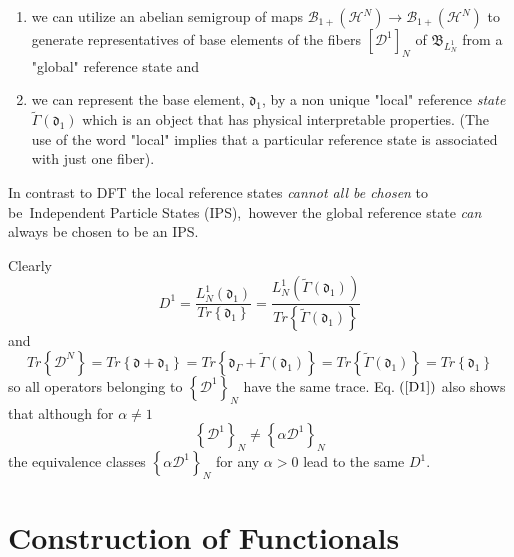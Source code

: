 \documentclass[aps,preprint]{revtex4}%
\begin{document}
\begin{enumerate}
\item we can utilize an abelian semigroup of maps $\mathcal{B}_{1+}\left(
\mathcal{H}^{N}\right)  \rightarrow\mathcal{B}_{1+}\left(  \mathcal{H}%
^{N}\right)  $ to generate representatives of base elements of the fibers
$\left[  \mathcal{D}^{1}\right]  _{N}$ of $\mathfrak{B}_{L_{N}^{1}}$ from a
"global" reference state and

\item we can represent the base element, $\mathfrak{d}_{1}$, by a non unique
"local" reference \emph{state} $\tilde{\Gamma}\left(  \mathfrak{d}_{1}\right)
$ which is an object that has physical interpretable properties. (The use of
the word "local" implies that a particular reference state is associated with
just one fiber).
\end{enumerate}

In contrast to DFT the local reference states \emph{cannot all be chosen }to
be\emph{\ }Independent Particle States (IPS),\emph{\ }however the global
reference state \emph{can }always be chosen to be an IPS.

Clearly
\begin{equation}
D^{1}=\frac{L_{N}^{1}\left(  \mathfrak{d}_{1}\right)  }{Tr\left\{
\mathfrak{d}_{1}\right\}  }=\frac{L_{N}^{1}\left(  \tilde{\Gamma}\left(
\mathfrak{d}_{1}\right)  \right)  }{Tr\left\{  \tilde{\Gamma}\left(
\mathfrak{d}_{1}\right)  \right\}  } \label{D1}%
\end{equation}
and
\begin{equation}
Tr\left\{  \mathcal{D}^{N}\right\}  =Tr\left\{  \mathfrak{d}+\mathfrak{d}%
_{1}\right\}  =Tr\left\{  \mathfrak{d}_{\Gamma}+\tilde{\Gamma}\left(
\mathfrak{d}_{1}\right)  \right\}  =Tr\left\{  \tilde{\Gamma}\left(
\mathfrak{d}_{1}\right)  \right\}  =Tr\left\{  \mathfrak{d}_{1}\right\}
\end{equation}
so all operators belonging to $\left\{  \mathcal{D}^{1}\right\}  _{N}$ have
the same trace. Eq. $\left(  \ref{D1}\right)  $ also shows that although for
$\alpha\neq1$
\begin{equation}
\left\{  \mathcal{D}^{1}\right\}  _{N}\neq\left\{  \alpha\mathcal{D}%
^{1}\right\}  _{N}%
\end{equation}
the equivalence classes $\left\{  \alpha\mathcal{D}^{1}\right\}  _{N}$ for any
$\alpha>0$ lead to the same $D^{1}$.

\section{Construction of Functionals \label{Functionals}}
\end{document}
